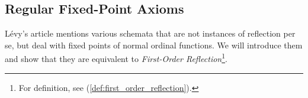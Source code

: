 \begin{comment}
In order to reach an inaccessible cardinal of size $\kappa$, one has to pass at least $\kappa$ limit ordinals. Them, to get to a Mahlo cardinal of size $\kappa$, one has to move past $\kappa$ inaccessible cardinals. This concept is then iterable for hyper-Mahlo cardinals, as we will see later in this section.





\end{comment} %

\subsection{Regular Fixed-Point Axioms}\label{sec:regular_fixed_points}
Lévy's article mentions various schemata that are not instances of reflection per se, but deal with fixed points of normal ordinal functions. We will introduce them and show that they are equivalent to \emph{First-Order Reflection}\footnote{For definition, see (\ref{def:first_order_reflection}).}.

